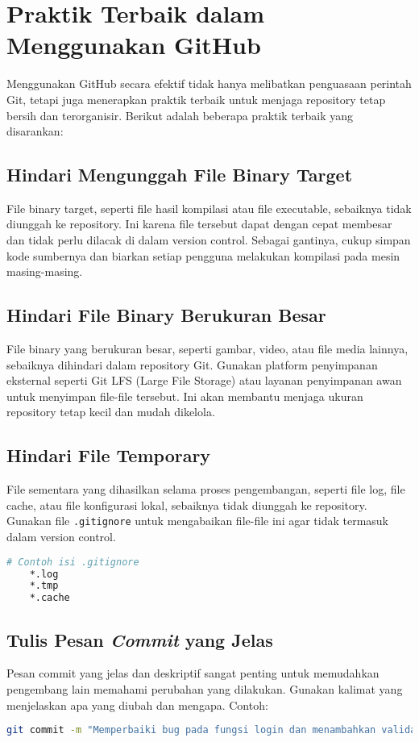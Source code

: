 \chapter{Praktik Terbaik dalam Menggunakan GitHub}

Menggunakan GitHub secara efektif tidak hanya melibatkan penguasaan perintah Git, tetapi juga menerapkan praktik terbaik untuk menjaga repository tetap bersih dan terorganisir. Berikut adalah beberapa praktik terbaik yang disarankan:

\section{Hindari Mengunggah File Binary Target}
File binary target, seperti file hasil kompilasi atau file executable, sebaiknya tidak diunggah ke repository. Ini karena file tersebut dapat dengan cepat membesar dan tidak perlu dilacak di dalam version control. Sebagai gantinya, cukup simpan kode sumbernya dan biarkan setiap pengguna melakukan kompilasi pada mesin masing-masing.

\section{Hindari File Binary Berukuran Besar}
File binary yang berukuran besar, seperti gambar, video, atau file media lainnya, sebaiknya dihindari dalam repository Git. Gunakan platform penyimpanan eksternal seperti Git LFS (Large File Storage) atau layanan penyimpanan awan untuk menyimpan file-file tersebut. Ini akan membantu menjaga ukuran repository tetap kecil dan mudah dikelola.

\section{Hindari File Temporary}
File sementara yang dihasilkan selama proses pengembangan, seperti file log, file cache, atau file konfigurasi lokal, sebaiknya tidak diunggah ke repository. Gunakan file \texttt{.gitignore} untuk mengabaikan file-file ini agar tidak termasuk dalam version control.
\begin{lstlisting}[language=bash]
	# Contoh isi .gitignore
	*.log
	*.tmp
	*.cache
\end{lstlisting}

\section{Tulis Pesan \textit{Commit} yang Jelas}
Pesan commit yang jelas dan deskriptif sangat penting untuk memudahkan pengembang lain memahami perubahan yang dilakukan. Gunakan kalimat yang menjelaskan apa yang diubah dan mengapa. Contoh:
\begin{lstlisting}[language=bash]
	git commit -m "Memperbaiki bug pada fungsi login dan menambahkan validasi input"
\end{lstlisting}

